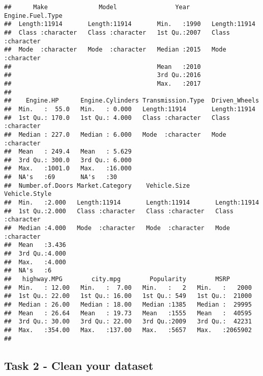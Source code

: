 \documentclass[
]{article}
\begin{document}
\begin{verbatim}
##      Make              Model                Year      Engine.Fuel.Type  
##  Length:11914       Length:11914       Min.   :1990   Length:11914      
##  Class :character   Class :character   1st Qu.:2007   Class :character  
##  Mode  :character   Mode  :character   Median :2015   Mode  :character  
##                                        Mean   :2010                     
##                                        3rd Qu.:2016                     
##                                        Max.   :2017                     
##                                                                         
##    Engine.HP      Engine.Cylinders Transmission.Type  Driven_Wheels     
##  Min.   :  55.0   Min.   : 0.000   Length:11914       Length:11914      
##  1st Qu.: 170.0   1st Qu.: 4.000   Class :character   Class :character  
##  Median : 227.0   Median : 6.000   Mode  :character   Mode  :character  
##  Mean   : 249.4   Mean   : 5.629                                        
##  3rd Qu.: 300.0   3rd Qu.: 6.000                                        
##  Max.   :1001.0   Max.   :16.000                                        
##  NA's   :69       NA's   :30                                            
##  Number.of.Doors Market.Category    Vehicle.Size       Vehicle.Style     
##  Min.   :2.000   Length:11914       Length:11914       Length:11914      
##  1st Qu.:2.000   Class :character   Class :character   Class :character  
##  Median :4.000   Mode  :character   Mode  :character   Mode  :character  
##  Mean   :3.436                                                           
##  3rd Qu.:4.000                                                           
##  Max.   :4.000                                                           
##  NA's   :6                                                               
##   highway.MPG        city.mpg        Popularity        MSRP        
##  Min.   : 12.00   Min.   :  7.00   Min.   :   2   Min.   :   2000  
##  1st Qu.: 22.00   1st Qu.: 16.00   1st Qu.: 549   1st Qu.:  21000  
##  Median : 26.00   Median : 18.00   Median :1385   Median :  29995  
##  Mean   : 26.64   Mean   : 19.73   Mean   :1555   Mean   :  40595  
##  3rd Qu.: 30.00   3rd Qu.: 22.00   3rd Qu.:2009   3rd Qu.:  42231  
##  Max.   :354.00   Max.   :137.00   Max.   :5657   Max.   :2065902  
## 
\end{verbatim}

\hypertarget{task-2---clean-your-dataset}{%
\subsection{Task 2 - Clean your
dataset}\label{task-2---clean-your-dataset}}
\end{document}
